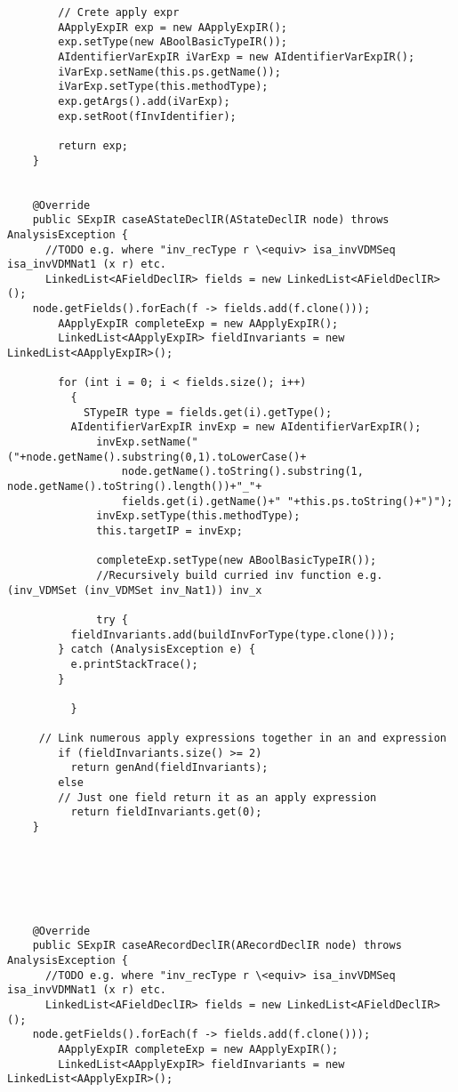 \begin{appendices}
\begin{lstlisting}
        // Crete apply expr
        AApplyExpIR exp = new AApplyExpIR();
        exp.setType(new ABoolBasicTypeIR());
        AIdentifierVarExpIR iVarExp = new AIdentifierVarExpIR();
        iVarExp.setName(this.ps.getName());
        iVarExp.setType(this.methodType);
        exp.getArgs().add(iVarExp);
        exp.setRoot(fInvIdentifier);

        return exp;
    }

    
    @Override
    public SExpIR caseAStateDeclIR(AStateDeclIR node) throws AnalysisException {
      //TODO e.g. where "inv_recType r \<equiv> isa_invVDMSeq isa_invVDMNat1 (x r) etc. 
      LinkedList<AFieldDeclIR> fields = new LinkedList<AFieldDeclIR>();
    node.getFields().forEach(f -> fields.add(f.clone()));
        AApplyExpIR completeExp = new AApplyExpIR();
        LinkedList<AApplyExpIR> fieldInvariants = new LinkedList<AApplyExpIR>();
        
        for (int i = 0; i < fields.size(); i++) 
          {
            STypeIR type = fields.get(i).getType();
          AIdentifierVarExpIR invExp = new AIdentifierVarExpIR();
              invExp.setName("("+node.getName().substring(0,1).toLowerCase()+
                  node.getName().toString().substring(1, node.getName().toString().length())+"_"+
                  fields.get(i).getName()+" "+this.ps.toString()+")");
              invExp.setType(this.methodType);
              this.targetIP = invExp;
        
              completeExp.setType(new ABoolBasicTypeIR());
              //Recursively build curried inv function e.g.  (inv_VDMSet (inv_VDMSet inv_Nat1)) inv_x
             
              try {
          fieldInvariants.add(buildInvForType(type.clone()));
        } catch (AnalysisException e) {
          e.printStackTrace();
        }
          
          }
      
     // Link numerous apply expressions together in an and expression
        if (fieldInvariants.size() >= 2)
          return genAnd(fieldInvariants);
        else
        // Just one field return it as an apply expression
          return fieldInvariants.get(0);
    }
    
    
    
    
    
    
    @Override
    public SExpIR caseARecordDeclIR(ARecordDeclIR node) throws AnalysisException {
      //TODO e.g. where "inv_recType r \<equiv> isa_invVDMSeq isa_invVDMNat1 (x r) etc. 
      LinkedList<AFieldDeclIR> fields = new LinkedList<AFieldDeclIR>();
    node.getFields().forEach(f -> fields.add(f.clone()));
        AApplyExpIR completeExp = new AApplyExpIR();
        LinkedList<AApplyExpIR> fieldInvariants = new LinkedList<AApplyExpIR>();
        

\end{lstlisting}
\end{appendices}

